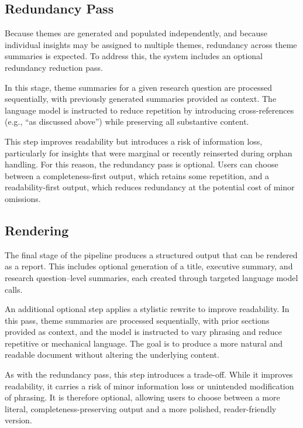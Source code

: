 \documentclass[
  11pt,
]{article}
\begin{document}
\subsection{Redundancy Pass}\label{redundancy-pass}

Because themes are generated and populated independently, and because
individual insights may be assigned to multiple themes, redundancy
across theme summaries is expected. To address this, the system includes
an optional redundancy reduction pass.

In this stage, theme summaries for a given research question are
processed sequentially, with previously generated summaries provided as
context. The language model is instructed to reduce repetition by
introducing cross-references (e.g., ``as discussed above'') while
preserving all substantive content.

This step improves readability but introduces a risk of information
loss, particularly for insights that were marginal or recently
reinserted during orphan handling. For this reason, the redundancy pass
is optional. Users can choose between a completeness-first output, which
retains some repetition, and a readability-first output, which reduces
redundancy at the potential cost of minor omissions.

\subsection{Rendering}\label{rendering}

The final stage of the pipeline produces a structured output that can be
rendered as a report. This includes optional generation of a title,
executive summary, and research question--level summaries, each created
through targeted language model calls.

An additional optional step applies a stylistic rewrite to improve
readability. In this pass, theme summaries are processed sequentially,
with prior sections provided as context, and the model is instructed to
vary phrasing and reduce repetitive or mechanical language. The goal is
to produce a more natural and readable document without altering the
underlying content.

As with the redundancy pass, this step introduces a trade-off. While it
improves readability, it carries a risk of minor information loss or
unintended modification of phrasing. It is therefore optional, allowing
users to choose between a more literal, completeness-preserving output
and a more polished, reader-friendly version.
\end{document}
